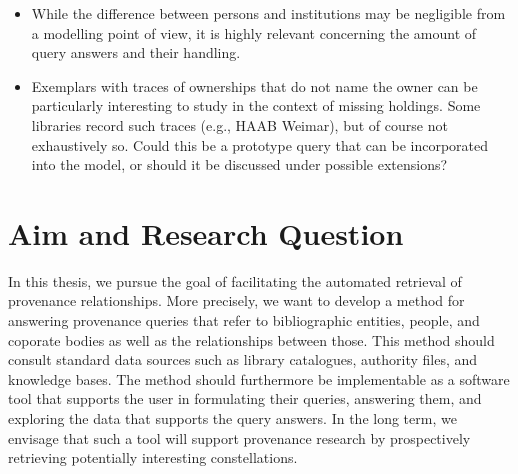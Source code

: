 

%
\begin{itemize}
  \item
    While the difference between persons and institutions may be negligible
    from a modelling point of view, it is highly relevant concerning the
    amount of query answers and their handling.
  \item
    Exemplars with traces of ownerships that do not name the owner
    can be particularly interesting to study in the context of missing holdings.
    Some libraries record such traces (e.g., HAAB Weimar), but of course not exhaustively so.
    Could this be a prototype query that can be incorporated into the model,
    or should it be discussed under possible extensions?
\end{itemize}

\section{Aim and Research Question}
\label{sec:research_questions}

In this thesis, we pursue the goal of facilitating
the automated retrieval of provenance relationships.
More precisely,
we want to develop a method for answering provenance queries that refer to bibliographic entities, people, and coporate bodies
as well as the relationships between those. This method should consult standard data sources such as
library catalogues, authority files, and knowledge bases. The method should furthermore be implementable as a software tool
that supports the user in formulating their queries, answering them, and exploring the data that supports the query answers.
In the long term, we envisage that such a tool will support provenance research
by prospectively retrieving potentially interesting constellations.

